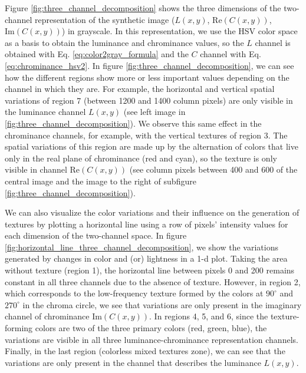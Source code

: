 \documentclass[journal]{IEEEtran}
\newcommand{\RE}{\mathrm{Re}}
\newcommand{\IM}{\mathrm{Im}}
\begin{document}
Figure \ref{fig:three_channel_decomposition} shows the three dimensions of the two-channel representation of the synthetic image ($L(x,y)$, $\RE(C(x,y))$, $\IM(C(x,y))$) in grayscale. In this representation, we use the HSV color space as a basis to obtain the luminance and chrominance values, so the $L$ channel is obtained with Eq. \eqref{eq:color2gray_formula} and the $C$ channel with Eq. \eqref{eq:chrominance_hsv2}. In figure \ref{fig:three_channel_decomposition}, we can see how the different regions show more or less important values depending on the channel in which they are. For example, the horizontal and vertical spatial variations of region 7 (between 1200 and 1400 column pixels) are only visible in the luminance channel $L(x,y)$ (see left image in \ref{fig:three_channel_decomposition}). We observe this same effect in the chrominance channels, for example, with the vertical textures of region 3. The spatial variations of this region are made up by the alternation of colors that live only in the real plane of chrominance (red and cyan), so the texture is only visible in channel $\RE(C(x,y))$ (see column pixels between 400 and 600 of the central image and the image to the right of subfigure \ref{fig:three_channel_decomposition}). 

We can also visualize the color variations and their influence on the generation of textures by plotting a horizontal line using a row of pixels' intensity values for each dimension of the two-channel space. In figure \ref{fig:horizontal_line_three_channel_decomposition}, we show the variations generated by changes in color and (or) lightness in a 1-d plot. Taking the area without texture (region 1), the horizontal line between pixels 0 and 200 remains constant in all three channels due to the absence of texture. However, in region 2, which corresponds to the low-frequency texture formed by the colors at $90^\circ$ and $270^\circ$ in the chroma circle, we see that variations are only present in the imaginary channel of chrominance $\IM(C(x,y))$. In regions 4, 5, and 6, since the texture-forming colors are two of the three primary colors (red, green, blue), the variations are visible in all three luminance-chrominance representation channels. Finally, in the last region (colorless mixed textures zone), we can see that the variations are only present in the channel that describes the luminance $L(x,y)$.
\end{document}
